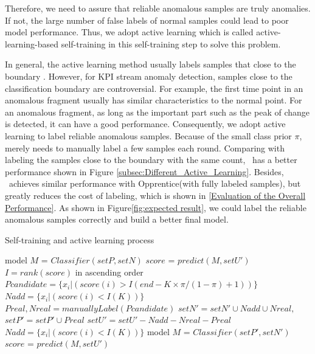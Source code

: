 Therefore, we need to assure that reliable anomalous samples are truly anomalies. If not, the large number of false labels of normal samples could lead to poor model performance.
Thus, we adopt active learning which is called active-learning-based self-training in this self-training step to solve this problem.
\par
In general, the active learning method usually labels samples that close to the boundary \cite{activelearning2015}.
 However, for KPI stream anomaly detection, samples close to the classification boundary are controversial. For example, the first time point in an anomalous fragment usually has similar characteristics to the normal point. For an anomalous fragment, as long as the important part such as the peak of change is detected, it can have a good performance.
Consequently, we adopt active learning to label reliable anomalous samples.
Because of the small class prior $\pi$, \name~ merely needs to manually label a few samples each round. Comparing with labeling the samples close to the boundary with the same count, \name~has a better performance shown in Figure \ref{subsec:Different_Active_Learning}.
Besides, \name~achieves similar performance with Opprentice(with fully labeled samples)\cite{liu2015opprentice}, but greatly reduces the cost of labeling, which is shown in  \ref{Evaluation of the Overall Performance}.
As shown in Figure\ref{fig:expected result}, we could label the reliable anomalous samples correctly and build a better final model.
\begin{algorithm}
\caption{Self-training and active learning process} 
model $M$ = $Classifier(setP, setN)$\;
$score$ = $predict(M, setU')$\;
{ 
$I=rank(score)$ in ascending order\;
$Pcandidate=\{x_i|(score(i)>I(end-K\times\pi/(1-\pi)+1))\}$\;
$Nadd=\{x_i|(score(i)<I(K))\}$\;
$Preal,Nreal=manuallyLabel(Pcandidate)$\;
$setN'=setN'\cup Nadd \cup Nreal,$\;
$setP'=setP'\cup Preal$\;
$setU'=setU'-Nadd-Nreal-Preal$\;
$Nadd=\{x_i|(score(i)<I(K))\}$\;
model $M$ = $Classifier(setP', setN')$\;
$score$ = $predict(M, setU')$\;
} 
\end{algorithm}

